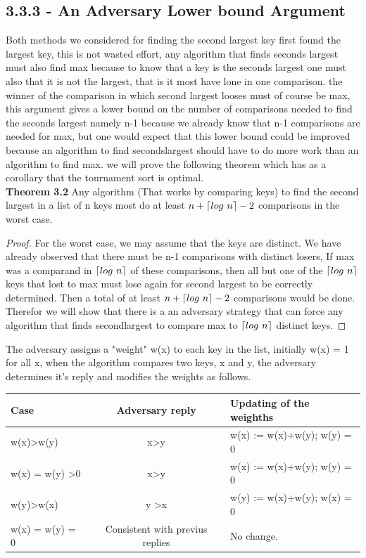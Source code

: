 \documentclass[a4paper,10pt,titlepage]{report}
\DeclarePairedDelimiter{\ceil}{\lceil}{\rceil}
\begin{document}
\subsection{3.3.3 - An Adversary Lower bound Argument}
Both methods we considered for finding the second largest key first found the largest key, this is not wasted effort, any algorithm that finds seconds largest must also find max because to know that a key is the seconds largest one must also that it is not the largest, that is it most have lone in one comparison. the winner of the comparison in which second largest looses must of course be max, this argument gives a lower bound on the number of comparisons needed to find the seconds largest namely n-1 because we already know that n-1 comparisons are needed for max, but one would expect that this lower bound could be improved because an algorithm to find secondslargest should have to do more work than an algorithm to find max. we will prove the following theorem which has as a corollary that the tournament sort is optimal.\\
\vspace{5mm}
\textbf{Theorem 3.2} Any algorithm (That works by comparing keys) to find the second largest in a list of n keys most do at least $n+\ceil{log \ n}-2$ comparisons in the worst case.
\begin{proof}
For the worst case, we may assume that the keys are distinct. 
We have already observed that there must be n-1 comparisons with distinct losers, 
If max was a comparand in $\ceil{log \ n}$ of these comparisons, then all but one of the $\ceil{log \ n}$ keys that lost to max must lose again for second largest to be correctly determined. 
Then a total of at least $n+\ceil{log \ n} -2$ comparisons would be done. Therefor we will show that there is a an adversary strategy that can force any algorithm that finds secondlargest to compare max to $\ceil{log \ n}$ distinct keys. 
\end{proof}
The adversary assigns a "weight" w(x) to each key in the list, initially w(x) = 1 for all x, when the algorithm compares two keys, x and y, the adversary determines it's reply and modifies the weights as follows.

\begin{tabular}{lcl}
Case & Adversary reply & Updating of the weighths \\ \hline
w(x)\textgreater{}w(y) & x\textgreater{}y & w(x) := w(x)+w(y); w(y) = 0 \\
w(x) = w(y) \textgreater 0 & x\textgreater{}y & w(x) := w(x)+w(y); w(y) = 0 \\
w(y)\textgreater w(x) & y \textgreater x & w(y) := w(x)+w(y); w(x) = 0 \\ \hline
w(x) = w(y) = 0 & Consistent with previus replies & No change.
\end{tabular}
\end{document}
